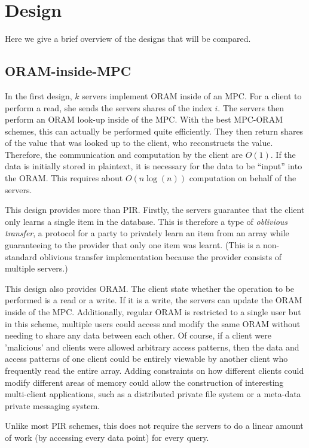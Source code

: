 \section{Design}

Here we give a brief overview of the designs that will be compared.

\subsection{ORAM-inside-MPC}
In the first design, $k$ servers implement ORAM inside of an MPC.
For a client to perform a read, she sends the servers shares
of the index $i$.
The servers then perform an ORAM look-up inside of the MPC.
With the best MPC-ORAM schemes, this can actually be performed
quite efficiently. They then return shares of the value
that was looked up to the client, who reconstructs the value.
Therefore, the communication and computation by the client are $O(1)$.
If the data is initially stored in plaintext, it is necessary
for the data to be ``input'' into the ORAM. This requires
about $O(n \log(n))$ computation on behalf of the servers.

This design provides more than PIR. 
Firstly, the servers guarantee that the client only learns a 
single item in the database.
This is therefore a type of \emph{oblivious transfer}, 
a protocol for a party to privately learn an item from an array
while guaranteeing to the provider that only one item was learnt.
(This is a non-standard oblivious transfer implementation 
because the provider consists of multiple servers.)

This design also provides ORAM.
The client state whether the operation to be performed is a read
or a write. If it is a write, the servers can update the ORAM 
inside of the MPC. 
Additionally, regular ORAM is restricted to a single user
but in this scheme, multiple users could access and modify
the same ORAM without needing to share any data between each other.
Of course, if a client were 'malicious' and clients were allowed
arbitrary access patterns, then the data and access patterns of
one client could be entirely viewable by another client who
frequently read the entire array.
Adding constraints on how different clients could modify different
areas of memory could allow the construction of interesting
multi-client applications, such as a distributed private file system
or a meta-data private messaging system.

Unlike most PIR schemes, this does not require the servers to
do a linear amount of work (by accessing every data point)
for every query.


